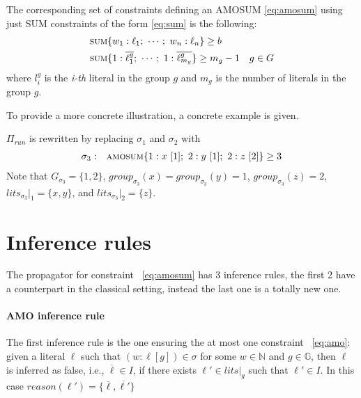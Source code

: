 The corresponding set of constraints defining an AMOSUM \eqref{eq:amosum} using just SUM constraints of the form \eqref{eq:sum}
is the following:
\begin{align*}
    & \textsc{sum}\{w_1 : \ell_1;\ \cdots;\ w_n : \ell_n\} \geq b\\
    & \textsc{sum}\{1 : \overline{\ell_{1}^g};\ \cdots;\ 1 : \overline{\ell_{m_{g}}^g}\} \geq m_{g} - 1 \quad g \in G
\end{align*}
where $l_{i}^g$ is the \textit{i-th} literal in the group $g$ and $m_{g}$ is the number of literals in the group $g$.

To provide a more concrete illustration,
a concrete example is given.
\begin{example}\label{ex:running-revised}
    $\Pi_{\mathit{run}}$ is rewritten by replacing $\sigma_1$ and $\sigma_2$ with
    \begin{align*}
    \begin{array}{rl}
        \sigma_{3}: & \textsc{amosum}\{
            1 : x\ [1];\ 2 : y\ [1];\ 2 : z\ [2]
        \} \geq 3
    \end{array}
    \end{align*}
    Note that $\mathit{G}_{\sigma_3}=\{1, 2\}$, 
    $\mathit{group}_{\sigma_{3}}(x) = \mathit{group}_{\sigma_{3}}(y) = 1$, 
    $\mathit{group}_{\sigma_{3}}(z) = 2$, 
    $\mathit{lits}_{\sigma_{3}}|_1 = \{x, y\}$, and
    $\mathit{lits}_{\sigma_{3}}|_2 = \{z\}$.
\end{example}
\section{Inference rules}
\label{sec:amo:inference_rules}
The propagator for constraint ~\ref{eq:amosum} has 3 inference rules,
the first 2 have a counterpart in the classical setting, instead the last
one is a totally new one.

\paragraph{AMO inference rule} 
\label{eq:amosum:propagation:1}
The first inference rule is the one ensuring the at most one constraint 
~\eqref{eq:amo}: given a literal 
$\ell$ such that $(w : \ell [g]) \in \sigma$ for some $w \in \mathbb{N}$ and $g \in \mathbb{G}$,
then $\ell$ is inferred as false, i.e., $\overline{\ell} \in I$, if there exists 
$\ell' \in \mathit{lits}|_g$ such that $\ell' \in I$. In this case
$\mathit{reason}(\ell')=\{\overline{\ell},\overline{\ell'}\}$

